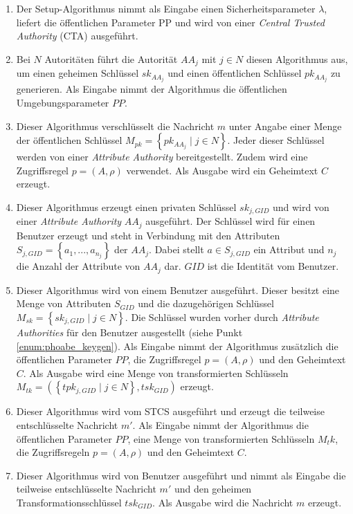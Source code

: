 \begin{enumerate}
	\item {} Der
		Setup-Algorithmus nimmt als Eingabe einen Sicherheitsparameter $\lambda$,
		liefert die öffentlichen Parameter $\text{PP}$ und wird von einer
		\textit{Central Trusted Authority} (CTA) ausgeführt.
	\item {} Bei $N$
		Autoritäten führt die Autorität $AA_j$ mit $j \in N$ diesen Algorithmus
		aus, um einen geheimen Schlüssel $sk_{AA_j}$ und einen öffentlichen
		Schlüssel $pk_{AA_j}$ zu generieren. Als Eingabe nimmt der Algorithmus die
		öffentlichen Umgebungsparameter $PP$.
	\item {} Dieser Algorithmus
		ver\-schlüs\-selt die Nachricht $m$ unter Angabe einer Menge der
		öffent\-lich\-en Schlüssel $M_{pk} = \left\{ pk_{AA_j} \;\vert\; j \in N
		\right\}$. Jeder dieser Schlüssel werden von einer \textit{Attribute
		Authority} bereitgestellt. Zudem wird eine Zugriffsregel $p = \left( A,
		\rho \right)$ verwendet. Als Ausgabe wird ein Geheimtext $C$ erzeugt.
	\item\label{enum:phoabe_keygen}  Dieser Algorithmus erzeugt einen privaten
		Schlüssel $sk_{j, GID}$ und wird von einer \textit{Attribute Authority}
		$AA_j$ ausgeführt. Der Schlüssel wird für einen Benutzer erzeugt und steht
		in Verbindung mit den Attributen $S_{j, GID} = \left\{ a_1, ..., a_{n_j}
		\right\}$ der $AA_j$.  Dabei stellt $a \in S_{j, GID}$ ein Attribut und
		$n_j$ die Anzahl der Attribute von $AA_j$ dar. $GID$ ist die Identität vom
		Benutzer.
	\item {} Dieser Algorithmus
		wird von einem Benutzer ausgeführt. Dieser besitzt eine Menge von
		Attributen $S_{GID}$ und die dazugehörigen Schlüssel $M_{sk} = \left\{
		sk_{j, GID} \;\vert\; j \in N \right\}$. Die Schlüssel wurden vorher durch
		\textit{Attribute Authorities} für den Benutzer ausgestellt (siehe Punkt
		\ref{enum:phoabe_keygen}). Als Eingabe nimmt der Algorithmus zusätzlich
		die öffentlichen Parameter $PP$, die Zugriffsregel $p = \left(A,
		\rho\right)$ und den Geheimtext $C$. Als Ausgabe wird eine Menge von
		transformierten Schlüsseln $M_{tk} = \left( \left\{tpk_{j, GID} \;\vert\;
		j \in N\right\}, tsk_{GID} \right)$ erzeugt.
	\item {} Dieser Algorithmus wird
		vom STCS ausgeführt und erzeugt die teilweise entschlüsselte Nachricht
		$m'$. Als Eingabe nimmt der Algorithmus die öffentlichen Parameter $PP$,
		eine Menge von transformierten Schlüsseln $M_tk$, die Zugriffsregeln $p =
		\left(A, \rho\right)$ und den Geheimtext $C$.
	\item {} Dieser Algorithmus wird von
		Benutzer ausgeführt und nimmt als Eingabe die teilweise entschlüsselte
		Nachricht $m'$ und den geheimen Transformationsschlüssel $tsk_{GID}$. Als
		Ausgabe wird die Nachricht $m$ erzeugt.
\end{enumerate}

